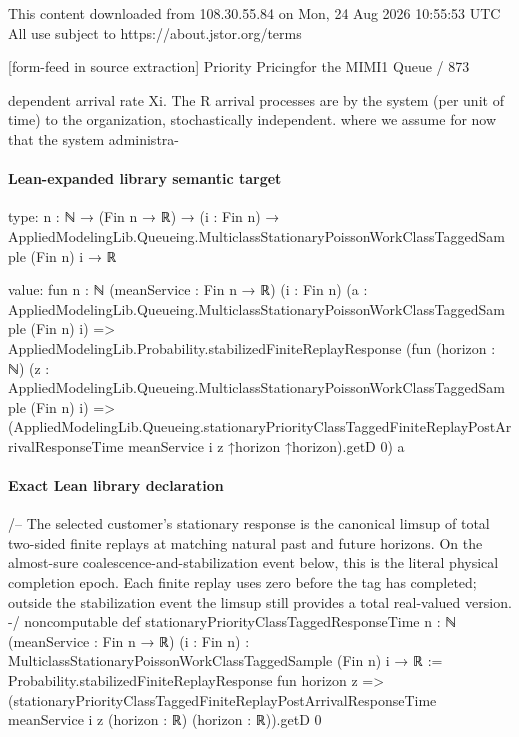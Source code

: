 \documentclass[10pt]{article}
\begin{document}
\begin{ReviewVerbatim}
                                                 This content downloaded from
                               108.30.55.84 on Mon, 24 Aug 2026 10:55:53 UTC
                                         All use subject to https://about.jstor.org/terms

[form-feed in source extraction]
                                                                                Priority Pricingfor the MIMI1 Queue / 873

dependent arrival rate Xi. The R arrival processes are                 by the system (per unit of time) to the organization,
stochastically independent.                                            where we assume for now that the system administra-
\end{ReviewVerbatim}



\paragraph{Lean-expanded library semantic target}
\begin{ReviewVerbatim}
type:
{n : ℕ} →
  (Fin n → ℝ) → (i : Fin n) → AppliedModelingLib.Queueing.MulticlassStationaryPoissonWorkClassTaggedSample (Fin n) i → ℝ

value:
fun {n : ℕ} (meanService : Fin n → ℝ) (i : Fin n)
    (a : AppliedModelingLib.Queueing.MulticlassStationaryPoissonWorkClassTaggedSample (Fin n) i) =>
  AppliedModelingLib.Probability.stabilizedFiniteReplayResponse
    (fun (horizon : ℕ) (z : AppliedModelingLib.Queueing.MulticlassStationaryPoissonWorkClassTaggedSample (Fin n) i) =>
      (AppliedModelingLib.Queueing.stationaryPriorityClassTaggedFiniteReplayPostArrivalResponseTime meanService i z
            ↑horizon ↑horizon).getD
        0)
    a
\end{ReviewVerbatim}

\paragraph{Exact Lean library declaration}
\begin{ReviewVerbatim}
/-- The selected customer's stationary response is the canonical limsup of
total two-sided finite replays at matching natural past and future horizons.
On the almost-sure coalescence-and-stabilization event below, this is the
literal physical completion epoch.  Each finite replay uses zero before the
tag has completed; outside the stabilization event the limsup still provides
a total real-valued version. -/
noncomputable def stationaryPriorityClassTaggedResponseTime
    {n : ℕ} (meanService : Fin n → ℝ) (i : Fin n) :
    MulticlassStationaryPoissonWorkClassTaggedSample (Fin n) i → ℝ :=
  Probability.stabilizedFiniteReplayResponse fun horizon z =>
    (stationaryPriorityClassTaggedFiniteReplayPostArrivalResponseTime
      meanService i z (horizon : ℝ) (horizon : ℝ)).getD 0
\end{ReviewVerbatim}
\end{document}
